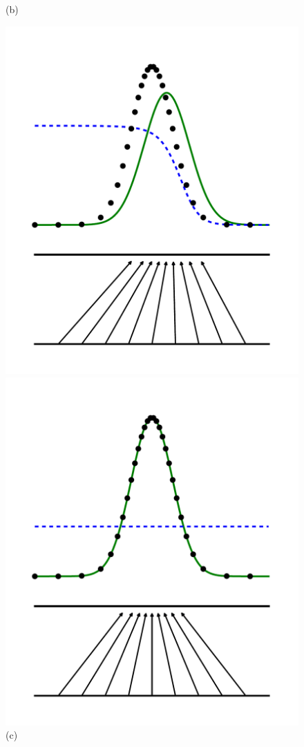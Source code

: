 \begin{figure}[h]
\begin{minipage}[c]{.5\columnwidth}
		 \caption{(b)}
	\end{minipage}
		\begin{minipage}[c]{.5\colunmwidth}
		 \includegraphics[]{fig3.pdf}
		 \caption{(c)}
	\end{minipage}
		\begin{minipage}[b]{.5\columnwidth}
		 \includegraphics[]{fig4.pdf}

\end{minipage}
\end{figure}
